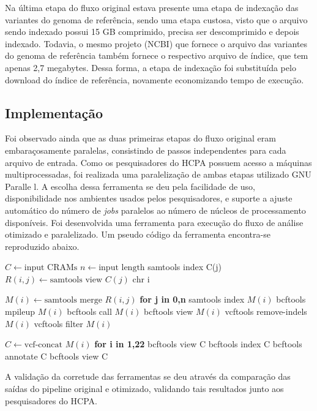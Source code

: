 \documentclass[cic,tc]{iiufrgs}
\begin{document}
Na última etapa do fluxo original estava presente uma etapa de indexação das
variantes do genoma de referência, sendo uma etapa custosa, visto que o arquivo
sendo indexado possui 15 GB comprimido, precisa ser descomprimido e depois
indexado. Todavia, o mesmo projeto (NCBI) que fornece o arquivo das variantes
do genoma de referência também fornece o respectivo arquivo de índice, que tem
apenas 2,7 megabytes. Dessa forma, a etapa de indexação foi substituída pelo
download do índice de referência, novamente economizando tempo de execução.

\subsection{Implementação}

Foi observado ainda que as duas primeiras etapas do fluxo original eram
embaraçosamente paralelas, consistindo de passos independentes para cada
arquivo de entrada.  Como os pesquisadores do HCPA possuem acesso a máquinas
multiprocessadas, foi realizada uma paralelização de ambas etapas utilizado GNU
Paralle \cite{tange_ole_2021_5233953}l. A escolha dessa ferramenta se deu pela
facilidade de uso, disponibilidade nos ambientes usados pelos pesquisadores, e
suporte a ajuste automático do número de \textit{jobs} paralelos ao número de
núcleos de processamento disponíveis. Foi desenvolvida uma ferramenta para
execução do fluxo de análise otimizado e paralelizado. Um pseudo código da
ferramenta encontra-se reproduzido abaixo.

\begin{algorithmic}
  \State $C \gets \text{input CRAMs}$
  \State $n \gets \text{input length}$
  \State samtools index C(j)
    \State $R(i,j) \gets \text{samtools view } C(j) \text{ chr i}$
  \EndFor
\EndFor

  \State $M(i) \gets \text{samtools merge } R(i,j)$ \textbf{for j in 0,n}
  \State samtools index $M(i)$
  \State bcftools mpileup $M(i)$
  \State bcftools call $M(i)$
  \State bcftools view $M(i)$
  \State vcftools remove-indels $M(i)$
  \State vcftools filter $M(i)$
\EndFor

\State $C \gets \text{vcf-concat } M(i)$ \textbf{for i in 1,22}
\State bcftools view C
\State bcftools index C
\State bcftools annotate C
\State bcftools view C
\end{algorithmic}

A validação da corretude das ferramentas se deu através da comparação das
saídas do pipeline original e otimizado, validando tais resultados junto aos
pesquisadores do HCPA.
\end{document}
